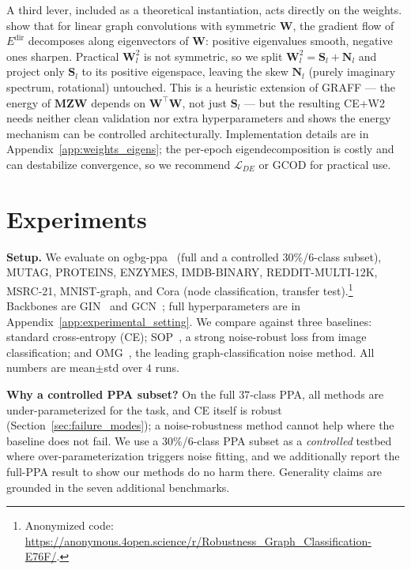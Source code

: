 \documentclass{article}
\theoremstyle{definition}
\newcommand{\method}{GCOD}
\newcommand{\Edir}{E^{\text{dir}}}
\begin{document}
A third lever, included as a theoretical instantiation, acts directly on the weights. \citet{GRAFF} show that for linear graph convolutions with symmetric $\mathbf{W}$, the gradient flow of $\Edir$ decomposes along eigenvectors of $\mathbf{W}$: positive eigenvalues smooth, negative ones sharpen. Practical $\mathbf{W}_l^2$ is not symmetric, so we split $\mathbf{W}_l^2=\mathbf{S}_l+\mathbf{N}_l$ and project only $\mathbf{S}_l$ to its positive eigenspace, leaving the skew $\mathbf{N}_l$ (purely imaginary spectrum, rotational) untouched. This is a heuristic extension of GRAFF — the energy of $\mathbf{M}\mathbf{Z}\mathbf{W}$ depends on $\mathbf{W}^\top\mathbf{W}$, not just $\mathbf{S}_l$ — but the resulting CE+W2 needs neither clean validation nor extra hyperparameters and shows the energy mechanism can be controlled architecturally. Implementation details are in Appendix~\ref{app:weights_eigens}; the per-epoch eigendecomposition is costly and can destabilize convergence, so we recommend $\mathcal{L}_{DE}$ or \method{} for practical use.

\section{Experiments}
\label{sec:experiments}

\textbf{Setup.} We evaluate on ogbg-ppa~\citep{PPA} (full and a controlled $30\%$/$6$-class subset), MUTAG, PROTEINS, ENZYMES, IMDB-BINARY, REDDIT-MULTI-12K, MSRC-21, MNIST-graph, and Cora (node classification, transfer test).\footnote{Anonymized code: \url{https://anonymous.4open.science/r/Robustness_Graph_Classification-E76F/}.} Backbones are GIN~\citep{WL1} and GCN~\citep{gcn}; full hyperparameters are in Appendix~\ref{app:experimental_setting}. We compare against three baselines: standard cross-entropy (CE); SOP~\citep{liu2022robusttraininglabelnoise}, a strong noise-robust loss from image classification; and OMG~\citep{omg7}, the leading graph-classification noise method. All numbers are mean$\pm$std over $4$ runs.

\textbf{Why a controlled PPA subset?} On the full $37$-class PPA, all methods are under-parameterized for the task, and CE itself is robust (Section~\ref{sec:failure_modes}); a noise-robustness method cannot help where the baseline does not fail. We use a $30\%$/$6$-class PPA subset as a \emph{controlled} testbed where over-parameterization triggers noise fitting, and we additionally report the full-PPA result to show our methods do no harm there. Generality claims are grounded in the seven additional benchmarks.
\end{document}
